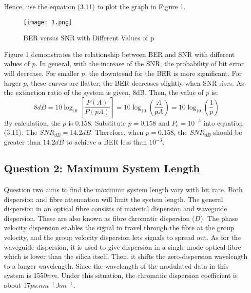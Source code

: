 \documentclass[12pt]{article}
\begin{document}
    Hence, use the equation (3.11) to plot the graph in Figure 1.
    \begin{figure}[H]
    \centering
    \texttt{[image: 1.png]}
    \caption{BER versus SNR with Different Values of p}
    \end{figure}
    Figure 1 demonstrates the relationship between BER and SNR with different values of $p$. In general, with the increase of the SNR, the probability of bit error will decrease. For smaller $p$, the downtrend for the BER is more significant. For larger $p$, these curves are flatter; the BER decreases slightly when SNR rises. As the extinction ratio of the system is given, 8dB. Then, the value of $p$ is:
    \begin{equation}
        8dB=10 \log_{10} [\frac{P(A)}{P(pA)}]=10 \log_{10} (\frac{A}{pA})=10 \log_{10} (\frac{1}{p})
    \end{equation}
    By calculation, the $p$ is $0.158$. Substitute $p=0.158$ and $P_e=10^{-3}$ into equation (3.11). The $SNR_{dB}=14.2dB$. Therefore, when $p=0.158$, the $SNR_{dB}$ should be greater than $14.2dB$ to achieve a BER less than $10^{-3}$.
    
        
    \subsection{Question 2: Maximum System Length}
    \paragraph{}
    Question two aims to find the maximum system length vary with bit rate. Both dispersion and fibre attenuation will limit the system length. The general dispersion in an optical fibre consists of material dispersion and waveguide dispersion. These are also known as fibre chromatic dispersion ($D$). The phase velocity dispersion enables the signal to travel through the fibre at the group velocity, and the group velocity dispersion lets signals to spread out. As for the waveguide dispersion, it is used to give dispersion in a single-mode optical fibre which is lower than the silica itself. Then, it shifts the zero-dispersion wavelength to a longer wavelength. Since the wavelength of the modulated data in this system is 1550$nm$. Under this situation, the chromatic dispersion coefficient is about 17$ps.nm^{-1}.km^{-1}$.
    
\end{document}
